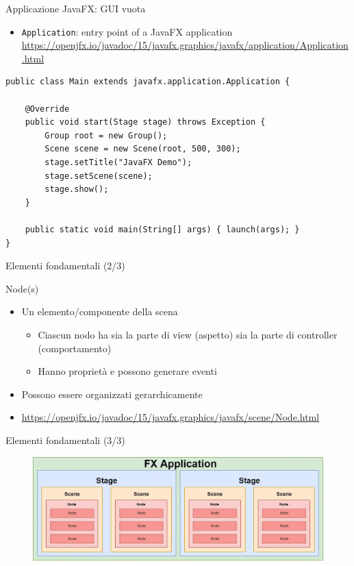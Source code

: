 \documentclass[presentation]{beamer}
\begin{document}
\begin{frame}[fragile]{Applicazione JavaFX: GUI vuota}

\begin{itemize}
\item \texttt{Application}: entry point of a JavaFX application
\\ \url{https://openjfx.io/javadoc/15/javafx.graphics/javafx/application/Application.html}
\end{itemize}

\begin{lstlisting}
public class Main extends javafx.application.Application {

	@Override
	public void start(Stage stage) throws Exception {
		Group root = new Group();
		Scene scene = new Scene(root, 500, 300);
		stage.setTitle("JavaFX Demo");
		stage.setScene(scene);
		stage.show();
	}

	public static void main(String[] args) { launch(args); }
}
\end{lstlisting}
\end{frame}

\begin{frame} {Elementi fondamentali (2/3)}
\begin{block}{Node(s)}
\begin{itemize}
\item Un elemento/componente della scena
\begin{itemize}
\item Ciascun nodo ha sia la parte di view (aspetto) sia la parte di controller (comportamento)
\item Hanno proprietà e possono generare eventi
\end{itemize}
\item Possono essere organizzati gerarchicamente
\item \url{https://openjfx.io/javadoc/15/javafx.graphics/javafx/scene/Node.html}
\end{itemize}
\end{block}
\end{frame}

\begin{frame}{Elementi fondamentali (3/3)}
\begin{figure}
\includegraphics[width=\textwidth]{img/javafx-app.png}
\end{figure}
\end{frame}
\end{document}
